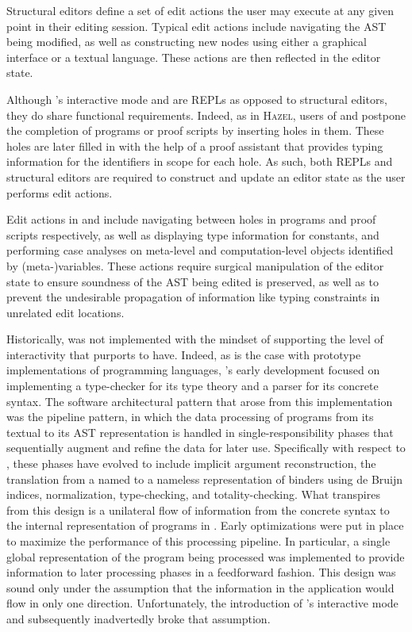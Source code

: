 Structural editors define a set of edit actions the user may execute at any given point in their editing session.
Typical edit actions include navigating the \ac{AST} being modified, as well as constructing new nodes using either a graphical interface or a textual language.
These actions are then reflected in the editor state.

Although \Beluga's interactive mode and \Harpoon are \acp{REPL} as opposed to structural editors, they do share functional requirements.
Indeed, as in \textsc{Hazel}, users of \Beluga and \Harpoon postpone the completion of programs or proof scripts by inserting holes in them.
These holes are later filled in with the help of a proof assistant that provides typing information for the identifiers in scope for each hole.
As such, both \acp{REPL} and structural editors are required to construct and update an editor state as the user performs edit actions.

Edit actions in \Beluga and \Harpoon include navigating between holes in programs and proof scripts respectively, as well as displaying type information for constants, and performing case analyses on meta-level and computation-level objects identified by (meta-)variables.
These actions require surgical manipulation of the editor state to ensure soundness of the \ac{AST} being edited is preserved, as well as to prevent the undesirable propagation of information like typing constraints in unrelated edit locations.

Historically, \Beluga was not implemented with the mindset of supporting the level of interactivity that \Harpoon purports to have.
Indeed, as is the case with prototype implementations of programming languages, \Beluga's early development focused on implementing a type-checker for its type theory and a parser for its concrete syntax.
The software architectural pattern that arose from this implementation was the pipeline pattern, in which the data processing of programs from its textual to its \ac{AST} representation is handled in single-responsibility phases that sequentially augment and refine the data for later use.
Specifically with respect to \Beluga, these phases have evolved to include implicit argument reconstruction, the translation from a named to a nameless representation of binders using de Bruijn indices, normalization, type-checking, and totality-checking.
What transpires from this design is a unilateral flow of information from the concrete syntax to the internal representation of programs in \Beluga.
Early optimizations were put in place to maximize the performance of this processing pipeline.
In particular, a single global representation of the \Beluga program being processed was implemented to provide information to later processing phases in a feedforward fashion.
This design was sound only under the assumption that the information in the application would flow in only one direction.
Unfortunately, the introduction of \Beluga's interactive mode and subsequently \Harpoon inadvertedly broke that assumption.


